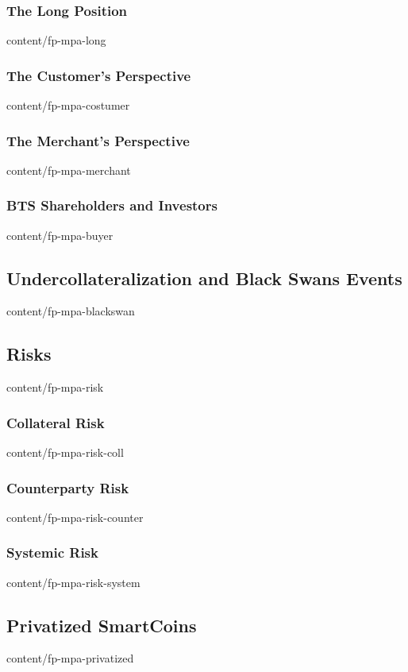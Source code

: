 \documentclass{btswhitepaper}
\begin{document}
\subsubsection  { The Long Position                                }  { content/fp-mpa-long            } 
\subsubsection  { The Customer's Perspective                       }  { content/fp-mpa-costumer        } 
\subsubsection  { The Merchant's Perspective                       }  { content/fp-mpa-merchant        } 
\subsubsection  { BTS Shareholders and Investors                   }  { content/fp-mpa-buyer           } 
\subsection     { Undercollateralization and Black Swans Events    }  { content/fp-mpa-blackswan       } 
\subsection     { Risks                                            }  { content/fp-mpa-risk            } 
\subsubsection  { Collateral Risk                                  }  { content/fp-mpa-risk-coll       } 
\subsubsection  { Counterparty Risk                                }  { content/fp-mpa-risk-counter    } 
\subsubsection  { Systemic Risk                                    }  { content/fp-mpa-risk-system     } 
\subsection     { Privatized SmartCoins                            }  { content/fp-mpa-privatized      } 
\end{document}
